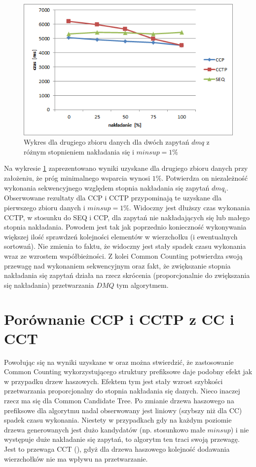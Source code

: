 \begin{figure}[h]
	\centering
	\includegraphics[width=0.8\linewidth]{figures/chart_50_1}
	\caption{Wykres dla drugiego zbioru danych dla dwóch zapytań \(dmq\) z różnym stopnieniem nakładania się i \(minsup = 1\%\)}
	\label{fig:chart_50_1}
\end{figure}
Na wykresie \ref{fig:chart_50_1} zaprezentowano wyniki uzyskane dla drugiego zbioru danych przy założeniu, że próg minimalnego wsparcia wynosi \(1\%\). Potwierdza on niezależność wykonania sekwencyjnego względem stopnia nakładania się zapytań \(dmq_i\). Obserwowane rezultaty dla CCP i CCTP przypominają te uzyskane dla pierwszego zbioru danych i \(minsup = 1\%\). Widoczny jest dłuższy czas wykonania CCTP, w stosunku do SEQ i CCP, dla zapytań nie nakładających się lub małego stopnia nakładania. Powodem jest tak jak poprzednio konieczność wykonywania większej ilość sprawdzeń kolejności elementów w wierzchołku (i ewentualnych sortowań). Nie zmienia to faktu, że widoczny jest stały spadek czasu wykonania wraz ze wzrostem współbieżności. Z kolei Common Counting potwierdza swoją przewagę nad wykonaniem sekwencyjnym oraz fakt, że zwiększanie stopnia nakładania się zapytań działa na rzecz skrócenia (proporcjonalnie do zwiększania się nakładania) przetwarzania \(DMQ\) tym algorytmem. 

\section{Porównanie CCP i CCTP z CC i CCT}
\label{c54}
Powołując się na wyniki uzyskane w \cite{WojciechowskiCC} oraz \cite{WojciechowskiCCT} można stwierdzić, że zastosowanie Common Counting wykorzystującego struktury prefiksowe daje podobny efekt jak w przypadku drzew haszowych. Efektem tym jest stały wzrost szybkości przetwarzania proporcjonalny do stopnia nakładania się danych. Nieco inaczej rzecz ma się dla Common Candidate Tree. Po zmianie drzewa haszowego na prefiksowe dla algorytmu nadal obserwowany jest liniowy (szybszy niż dla CC) spadek czasu wykonania. Niestety w przypadkach gdy na każdym poziomie drzewa generowanych jest dużo kandydatów (np. stosunkowo małe \(minsup\)) i nie występuje duże nakładanie się zapytań, to algorytm ten traci swoją przewagę. Jest to przewaga CCT (\cite{WojciechowskiCCT}), gdyż dla drzewa haszowego kolejność dodawania wierzchołków nie ma wpływu na przetwarzanie.


